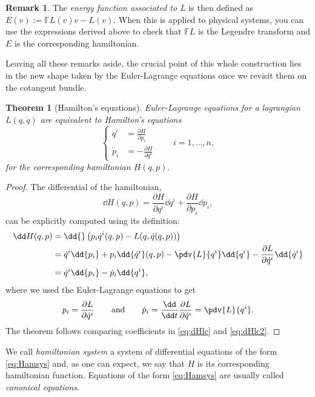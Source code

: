 \documentclass[english,fontsize=11pt,paper=b5]{scrbook}
\newtheorem{theorem}{Theorem}[chapter]
\theoremstyle{definition}
\newtheorem{remark}{Remark}[chapter]
\begin{document}
\begin{remark}
      The \emph{energy function associated to $L$} is then defined as $E(v) := \mathbb{F}L(v) v - L(v)$. When this is applied to physical systems, you can use the expressions derived above to check that $\mathbb{F}L$ is the Legendre transform and $E$ is the corresponding hamiltonian.
    \end{remark}

    Leaving all these remarks aside, the crucial point of this whole construction lies in the new shape taken by the Euler-Lagrange equations once we revisit them on the cotangent bundle.

    \begin{theorem}[Hamilton's equations]\label{thm:Hameqns}
      Euler-Lagrange equations for a lagrangian $L(q,\dot q)$ are equivalent to \emph{Hamilton's equations}
      \begin{equation}\label{eq:Hamsys}
        \left\lbrace
          \begin{aligned}
            \dot q^i & = \frac{\partial H}{\partial p_i}  \\
            \dot p_i & = -\frac{\partial H}{\partial q^i}
          \end{aligned}
        \right. \qquad i=1,\ldots,n,
      \end{equation}
      for the corresponding hamiltonian $H(q,p)$.
    \end{theorem}
    \begin{proof}
      The differential of the hamiltonian,
      \begin{equation}\label{eq:dHlc}
        \dd H(q,p) = \frac{\partial H}{\partial q^i}\dd q^i + \frac{\partial H}{\partial p_i}\dd p_i,
      \end{equation}
      can be explicitly computed using its definition:
      \begin{align}
        \dd H(q,p) & = \dd{}\left( p_i\dot{q}^i(q,p) - L(q, \dot{q}(q,p)) \right)                                                                             \\
                   & = \dot{q}^i \dd{p_i} + p_i \dd{\dot{q}^i}(q,p) - \pdv{L}{q^i} \dd{q^i} - \frac{\partial L}{\partial \dot{q}^i} \dd{\dot{q}^i} \\
                   & = \dot{q}^i \dd{p_i} - \dot{p}_i \dd{q^i}, \label{eq:dHlc2}
      \end{align}
      where we used the Euler-Lagrange equations to get
      \begin{equation}
        p_i = \frac{\partial L}{\partial \dot{q}^i}
        \qquad\mbox{and}\qquad
        \dot p_i = \frac{\dd }{\dd t}\frac{\partial L}{\partial \dot{q}^i} = \pdv{L}{q^i}.
      \end{equation}
      The theorem follows comparing coefficients in \eqref{eq:dHlc} and \eqref{eq:dHlc2}.
    \end{proof}
    We call \emph{hamiltonian system} a system of differential equations of the form \eqref{eq:Hamsys} and, as one can expect, we say that $H$ is its corresponding hamiltonian function. Equations of the form \eqref{eq:Hamsys} are usually called \emph{canonical equations}.
\end{document}
